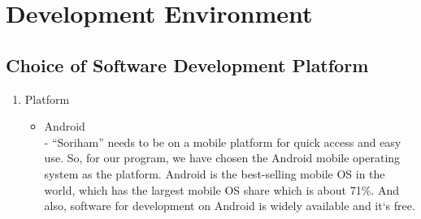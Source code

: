 \documentclass[conference]{IEEEtran}
\begin{document}
\section{Development Environment}

\subsection{Choice of Software Development Platform}
\begin{enumerate}
    \item Platform
    \begin{itemize}
        \item Android\\
        - “Soriham” needs to be on a mobile platform for quick access and easy use. So, for our program, we have chosen the Android mobile operating system as the platform. Android is the best-selling mobile OS in the world, which has the largest mobile OS share which is about 71\%. And also, software for development on Android is widely available and it`s free.\\\\\\
        
        
        

\end{itemize}
\end{enumerate}
\end{document}
